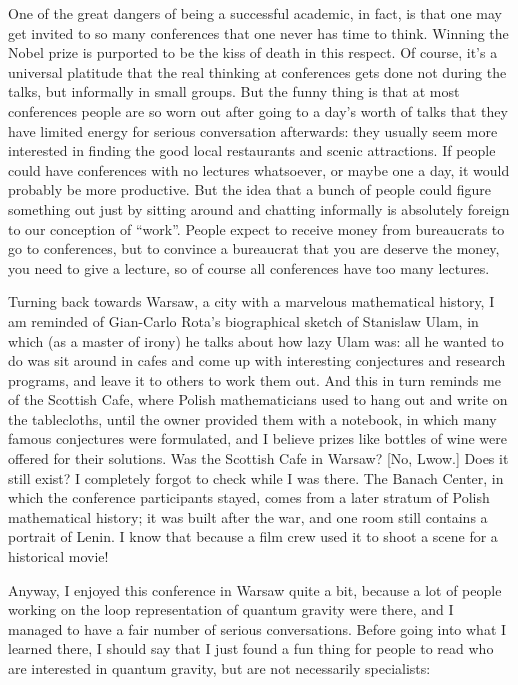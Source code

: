 \documentclass{article}
\begin{document}
One of the great dangers of being a successful academic, in fact, is
that one may get invited to so many conferences that one never has time
to think. Winning the Nobel prize is purported to be the kiss of death
in this respect. Of course, it's a universal platitude that the real
thinking at conferences gets done not during the talks, but informally
in small groups. But the funny thing is that at most conferences people
are so worn out after going to a day's worth of talks that they have
limited energy for serious conversation afterwards: they usually seem
more interested in finding the good local restaurants and scenic
attractions. If people could have conferences with no lectures
whatsoever, or maybe one a day, it would probably be more productive.
But the idea that a bunch of people could figure something out just by
sitting around and chatting informally is absolutely foreign to our
conception of ``work''. People expect to receive money from bureaucrats
to go to conferences, but to convince a bureaucrat that you are deserve
the money, you need to give a lecture, so of course all conferences have
too many lectures.

Turning back towards Warsaw, a city with a marvelous mathematical
history, I am reminded of Gian-Carlo Rota's biographical sketch of
Stanislaw Ulam, in which (as a master of irony) he talks about how lazy
Ulam was: all he wanted to do was sit around in cafes and come up with
interesting conjectures and research programs, and leave it to others to
work them out. And this in turn reminds me of the Scottish Cafe, where
Polish mathematicians used to hang out and write on the tablecloths,
until the owner provided them with a notebook, in which many famous
conjectures were formulated, and I believe prizes like bottles of wine
were offered for their solutions. Was the Scottish Cafe in Warsaw?
{[}No, Lwow.{]} Does it still exist? I completely forgot to check while
I was there. The Banach Center, in which the conference participants
stayed, comes from a later stratum of Polish mathematical history; it
was built after the war, and one room still contains a portrait of
Lenin. I know that because a film crew used it to shoot a scene for a
historical movie!

Anyway, I enjoyed this conference in Warsaw quite a bit, because a lot
of people working on the loop representation of quantum gravity were
there, and I managed to have a fair number of serious conversations.
Before going into what I learned there, I should say that I just found a
fun thing for people to read who are interested in quantum gravity, but
are not necessarily specialists:
\end{document}
